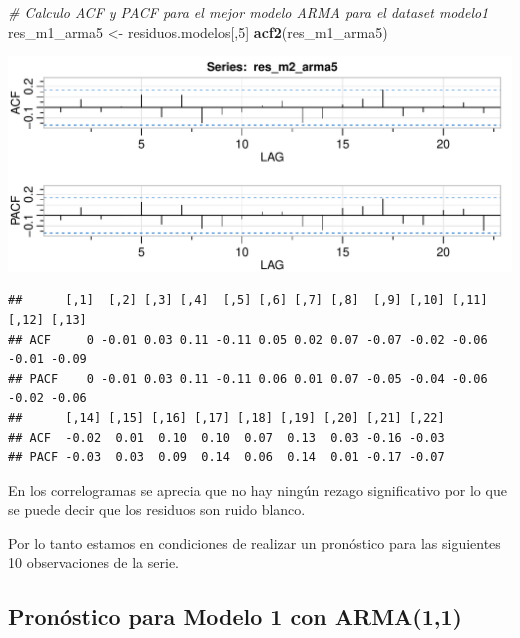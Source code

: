 \documentclass[
  11pt,
]{article}
\newenvironment{Shaded}{\begin{snugshade}}{\end{snugshade}}
\newcommand{\CommentTok}[1]{\textcolor[rgb]{0.56,0.35,0.01}{\textit{#1}}}
\newcommand{\DecValTok}[1]{\textcolor[rgb]{0.00,0.00,0.81}{#1}}
\newcommand{\KeywordTok}[1]{\textcolor[rgb]{0.13,0.29,0.53}{\textbf{#1}}}
\newcommand{\NormalTok}[1]{#1}
\newcommand{\StringTok}[1]{\textcolor[rgb]{0.31,0.60,0.02}{#1}}
\begin{document}
\begin{Shaded}
\begin{Highlighting}[]
\CommentTok{# Calculo ACF y PACF para el mejor modelo ARMA para el dataset modelo1}
\NormalTok{res_m1_arma5 <-}\StringTok{ }\NormalTok{residuos.modelos[,}\DecValTok{5}\NormalTok{]}
\KeywordTok{acf2}\NormalTok{(res_m1_arma5)}
\end{Highlighting}
\end{Shaded}

\begin{center}\includegraphics[width=0.9\linewidth]{RmdFigs/acf2_arma5-1} \end{center}

\begin{verbatim}
##      [,1]  [,2] [,3] [,4]  [,5] [,6] [,7] [,8]  [,9] [,10] [,11] [,12] [,13]
## ACF     0 -0.01 0.03 0.11 -0.11 0.05 0.02 0.07 -0.07 -0.02 -0.06 -0.01 -0.09
## PACF    0 -0.01 0.03 0.11 -0.11 0.06 0.01 0.07 -0.05 -0.04 -0.06 -0.02 -0.06
##      [,14] [,15] [,16] [,17] [,18] [,19] [,20] [,21] [,22]
## ACF  -0.02  0.01  0.10  0.10  0.07  0.13  0.03 -0.16 -0.03
## PACF -0.03  0.03  0.09  0.14  0.06  0.14  0.01 -0.17 -0.07
\end{verbatim}

En los correlogramas se aprecia que no hay ningún rezago significativo
por lo que se puede decir que los residuos son ruido blanco.

Por lo tanto estamos en condiciones de realizar un pronóstico para las
siguientes 10 observaciones de la serie.

\clearpage

\hypertarget{pronuxf3stico-para-modelo-1-con-arma11}{%
\subsection{Pronóstico para Modelo 1 con
ARMA(1,1)}\label{pronuxf3stico-para-modelo-1-con-arma11}}
\end{document}
